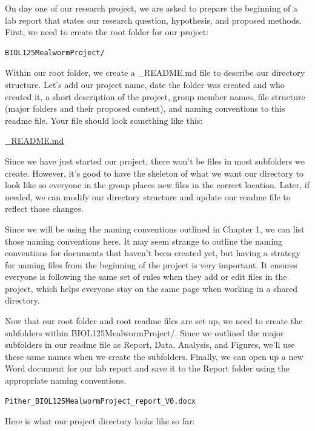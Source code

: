 \documentclass[
]{book}
\begin{document}
On day one of our research project, we are asked to prepare the beginning of a lab report that states our research question, hypothesis, and proposed methods. First, we need to create the root folder for our project:

\begin{verbatim}
BIOL125MealwormProject/
\end{verbatim}

Within our root folder, we create a \_README.md file to describe our directory structure. Let's add our project name, date the folder was created and who created it, a short description of the project, group member names, file structure (major folders and their proposed content), and naming conventions to this readme file. Your file should look something like this:

\href{files/DS_biol-125-readme_V0.md}{\_README.md}

Since we have just started our project, there won't be files in most subfolders we create. However, it's good to have the skeleton of what we want our directory to look like so everyone in the group places new files in the correct location. Later, if needed, we can modify our directory structure and update our readme file to reflect those changes.

Since we will be using the naming conventions outlined in Chapter 1, we can list those naming conventions here. It may seem strange to outline the naming conventions for documents that haven't been created yet, but having a strategy for naming files from the beginning of the project is very important. It ensures everyone is following the same set of rules when they add or edit files in the project, which helps everyone stay on the same page when working in a shared directory.

Now that our root folder and root readme files are set up, we need to create the subfolders within BIOL125MealwormProject/. Since we outlined the major subfolders in our readme file as Report, Data, Analysis, and Figures, we'll use these same names when we create the subfolders. Finally, we can open up a new Word document for our lab report and save it to the Report folder using the appropriate naming conventions.

\begin{verbatim}
Pither_BIOL125MealwormProject_report_V0.docx
\end{verbatim}

Here is what our project directory looks like so far:
\end{document}
